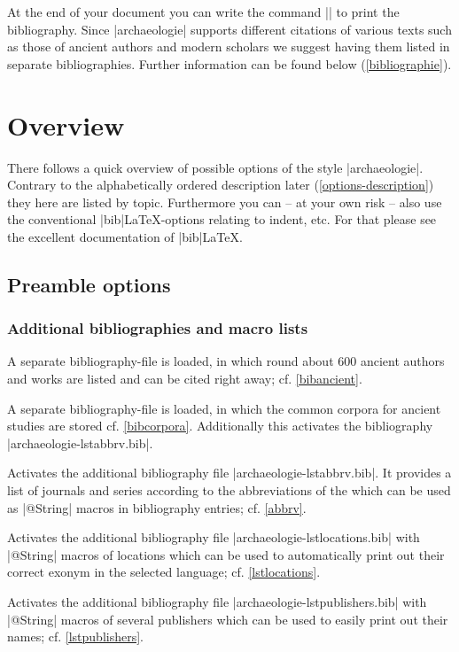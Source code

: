 \documentclass[a4paper,
10pt,
greek,
french,
spanish,
italian,
ngerman,
english,
]{ltxdoc}
\begin{document}
At the end of your document you can write the command |\printbibliography| to print 
the bibliography. 
Since |archaeologie| supports different citations of various texts such as those of ancient authors and  modern scholars we suggest  having them listed in separate bibliographies. 
Further information can be found below   (\cref{bibliographie}).

\section{Overview}\label{overview}
There follows a quick overview of possible options of the style |archaeologie|. 
Contrary to the alphabetically ordered description later (\cref{options-description}) they here are listed by topic.
Furthermore you can -- at your own risk -- also use the conventional |bib|\LaTeX-options relating to indent, etc. 
For that please see the excellent documentation of  |bib|\LaTeX.

\subsection{Preamble options}\label{preamble_options}
\subsubsection{Additional bibliographies and macro lists}
A separate bibliography-file is loaded, in which round about 
600 ancient authors and works are listed and can be cited right away; cf. \cref{bibancient}.

A separate bibliography-file is loaded, in which the common corpora for ancient studies are stored cf. \cref{bibcorpora}.
Additionally this activates the bibliography |archaeologie-lstabbrv.bib|.

Activates the additional bibliography file |archaeologie-lstabbrv.bib|.
It provides a list of journals and series according to the abbreviations of the 
\DAI which can be used as |@String| macros in bibliography entries; cf. \cref{abbrv}. 

Activates the additional bibliography file |archaeologie-lstlocations.bib|
with |@String| macros of locations which can be used to automatically print out their correct exonym in the selected language; cf. \cref{lstlocations}.

Activates the additional bibliography file |archaeologie-lstpublishers.bib| with |@String| macros 
of several publishers which can be used to easily print out their names; cf. \cref{lstpublishers}.
\end{document}
